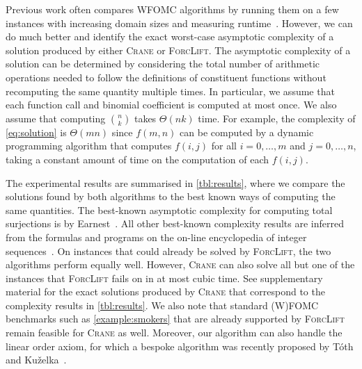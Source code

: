 \documentclass{article}
\theoremstyle{definition}
\begin{document}

Previous work often compares WFOMC algorithms by running them on a few instances
with increasing domain sizes and measuring
runtime~\cite{DBLP:conf/nips/Broeck11,DBLP:conf/ijcai/BroeckTMDR11,DBLP:conf/aaai/BroeckD12}.
However, we can do much better and identify the exact worst-case asymptotic
complexity of a solution produced by either \textsc{Crane} or \textsc{ForcLift}.
The asymptotic complexity of a solution can be determined by considering the
total number of arithmetic operations needed to follow the definitions of
constituent functions without recomputing the same quantity multiple times. In
particular, we assume that each function call and binomial coefficient is
computed at most once. We also assume that computing $\binom{n}{k}$ takes
$\Theta(nk)$ time. For example, the complexity of \cref{eq:solution} is
$\Theta(mn)$ since $f(m, n)$ can be computed by a dynamic programming algorithm
that computes $f(i, j)$ for all $i = 0, \dots, m$ and $j = 0, \dots, n$, taking
a constant amount of time on the computation of each $f(i, j)$.

The experimental results are summarised in \cref{tbl:results}, where we compare
the solutions found by both algorithms to the best known ways of computing the
same quantities. The best-known asymptotic complexity for computing total
surjections is by Earnest~. All other best-known complexity
results are inferred from the formulas and programs on the on-line encyclopedia
of integer sequences~\cite{oeis}. On instances that could already be solved by
\textsc{ForcLift}, the two algorithms perform equally well. However,
\textsc{Crane} can also solve all but one of the instances that
\textsc{ForcLift} fails on in at most cubic time. See supplementary material for
the exact solutions produced by \textsc{Crane} that correspond to the complexity
results in \cref{tbl:results}. We also note that standard (W)FOMC benchmarks
such as \cref{example:smokers} that are already supported by \textsc{ForcLift}
remain feasible for \textsc{Crane} as well. Moreover, our algorithm can also
handle the linear order axiom, for which a bespoke algorithm was recently
proposed by T{\'{o}}th and
Ku\v{z}elka~.
\end{document}
